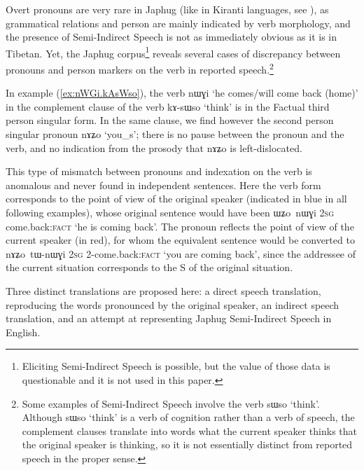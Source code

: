 \documentclass[oldfontcommands,oneside,a4paper,11pt]{article}
\newcommand{\ipa}[1]{{\phon \mbox{#1}}} %
\newcommand{\refb}[1]{(\ref{#1})}
\begin{document}
Overt pronouns are very rare in Japhug (like in Kiranti languages, see \citealt{bickel01deictic}), as grammatical relations and person are mainly indicated by verb morphology, and the presence of Semi-Indirect Speech is not as immediately obvious as it is in Tibetan. Yet, the Japhug corpus\footnote{Eliciting Semi-Indirect Speech is possible, but the value of those data is questionable and  it is not used in this paper.} reveals several cases of discrepancy between pronouns and person markers on the verb in reported speech.\footnote{Some examples of Semi-Indirect Speech involve the verb \ipa{sɯso} `think'. Although  \ipa{sɯso} `think' is a verb of cognition rather than a verb of speech, the complement clauses translate into words what the current speaker thinks that the original speaker is thinking, so it is not essentially distinct from reported speech in the proper sense.}


In example \refb{ex:nWGi.kAsWso}, the verb \ipa{nɯɣi} `he comes/will come back (home)' in the complement clause of the verb \ipa{kɤ-sɯso} `think' is in the Factual third person singular form. In the same clause, we find however the second person singular pronoun \ipa{nɤʑo} `you_s'; there is no pause between the pronoun and the verb, and no indication from the prosody that \ipa{nɤʑo} is left-dislocated. 

This type of mismatch  between pronouns and indexation on the verb is anomalous and never found in independent sentences. Here the verb form corresponds to the point of view of the original speaker (indicated in blue in all following examples), whose original sentence would have been \ipa{ɯʑo nɯɣi} \textsc{2sg} {come.back:\textsc{fact}} `he is coming back'. The pronoun reflects the point of view of the current speaker (in red), for whom the equivalent sentence would be converted to \ipa{nɤʑo tɯ-nɯɣi} \textsc{2sg} {2-come.back:\textsc{fact}} `you are coming back', since the addressee of the current situation corresponds to the S of the original situation.

Three distinct translations are proposed here: a direct speech translation, reproducing the words pronounced by the original speaker, an indirect speech translation, and an attempt at representing Japhug Semi-Indirect Speech in English.
\end{document}
